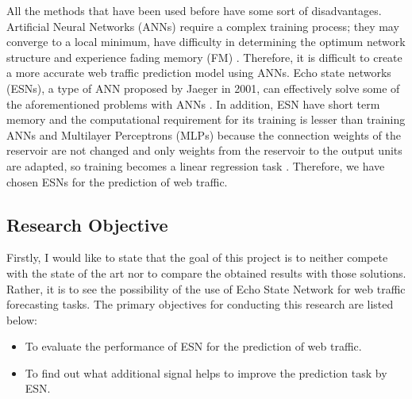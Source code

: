 
  All the methods that have been used before have some sort of disadvantages. Artificial Neural Networks (ANNs) require a complex training process; they may converge to a local minimum, have difficulty in determining the optimum network structure and experience fading memory (FM) \cite{wind}. Therefore, it is difficult to create a more accurate web traffic prediction model using ANNs.  Echo state networks (ESNs), a type of ANN proposed by Jaeger in 2001, can effectively solve some of the aforementioned problems with ANNs . In addition, ESN have short term memory and  the computational requirement for its training is lesser than training ANNs and Multilayer Perceptrons (MLPs) because  the connection weights of the reservoir are not changed and only weights from the reservoir to the output units are adapted, so training becomes a linear regression task \cite{ wind}.  Therefore, we have chosen ESNs for the prediction of web traffic.\\

  \subsection{Research Objective}
  Firstly, I would like to state that the goal of this project is to neither compete with the state of the art nor to compare the obtained results with those solutions. Rather, it is to see the possibility of the use of Echo State Network for web traffic forecasting tasks.
  The primary objectives for conducting this research are listed below:
  \begin{itemize}
  	\item To evaluate the performance of ESN for the prediction of web traffic.
	\item To find out what additional signal helps to improve the prediction task by ESN.
    \end{itemize}